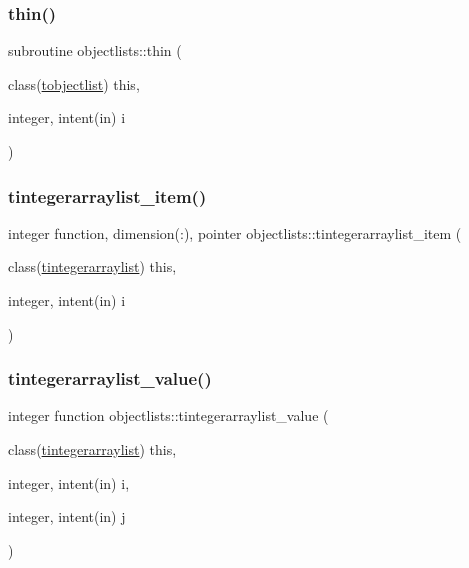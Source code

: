 \mbox{\label{namespaceobjectlists_a48d7726bdf69ff2b7cb84d89d12af19d}} 
\subsubsection{\texorpdfstring{thin()}{thin()}}
{\footnotesize\ttfamily subroutine objectlists\+::thin (\begin{DoxyParamCaption}\item[{class(\mbox{\hyperlink{structobjectlists_1_1tobjectlist}{tobjectlist}})}]{this,  }\item[{integer, intent(in)}]{i }\end{DoxyParamCaption})\hspace{0.3cm}{\ttfamily [private]}}

\mbox{\label{namespaceobjectlists_af82a464969f9660d2a7214413b8fe757}} 
\subsubsection{\texorpdfstring{tintegerarraylist\+\_\+item()}{tintegerarraylist\_item()}}
{\footnotesize\ttfamily integer function, dimension(\+:), pointer objectlists\+::tintegerarraylist\+\_\+item (\begin{DoxyParamCaption}\item[{class(\mbox{\hyperlink{structobjectlists_1_1tintegerarraylist}{tintegerarraylist}})}]{this,  }\item[{integer, intent(in)}]{i }\end{DoxyParamCaption})\hspace{0.3cm}{\ttfamily [private]}}

\mbox{\label{namespaceobjectlists_ab4bb3c50d65c18a798906fa87ad4a651}} 
\subsubsection{\texorpdfstring{tintegerarraylist\+\_\+value()}{tintegerarraylist\_value()}}
{\footnotesize\ttfamily integer function objectlists\+::tintegerarraylist\+\_\+value (\begin{DoxyParamCaption}\item[{class(\mbox{\hyperlink{structobjectlists_1_1tintegerarraylist}{tintegerarraylist}})}]{this,  }\item[{integer, intent(in)}]{i,  }\item[{integer, intent(in)}]{j }\end{DoxyParamCaption})\hspace{0.3cm}{\ttfamily [private]}}

